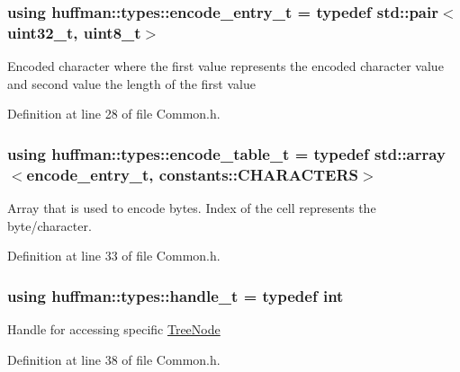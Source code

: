 \subsubsection[{\texorpdfstring{encode\+\_\+entry\+\_\+t}{encode_entry_t}}]{\setlength{\rightskip}{0pt plus 5cm}using {\bf huffman\+::types\+::encode\+\_\+entry\+\_\+t} = typedef std\+::pair$<$uint32\+\_\+t, uint8\+\_\+t$>$}\hypertarget{namespacehuffman_1_1types_a562530b9038f6a3cb2923f1c116a450c}{}\label{namespacehuffman_1_1types_a562530b9038f6a3cb2923f1c116a450c}
Encoded character where the first value represents the encoded character value and second value the length of the first value 

Definition at line 28 of file Common.\+h.

\subsubsection[{\texorpdfstring{encode\+\_\+table\+\_\+t}{encode_table_t}}]{\setlength{\rightskip}{0pt plus 5cm}using {\bf huffman\+::types\+::encode\+\_\+table\+\_\+t} = typedef std\+::array$<${\bf encode\+\_\+entry\+\_\+t}, {\bf constants\+::\+C\+H\+A\+R\+A\+C\+T\+E\+RS}$>$}\hypertarget{namespacehuffman_1_1types_a2d111e21190970dfeb935ef0786973c0}{}\label{namespacehuffman_1_1types_a2d111e21190970dfeb935ef0786973c0}
Array that is used to encode bytes. Index of the cell represents the byte/character. 

Definition at line 33 of file Common.\+h.

\subsubsection[{\texorpdfstring{handle\+\_\+t}{handle_t}}]{\setlength{\rightskip}{0pt plus 5cm}using {\bf huffman\+::types\+::handle\+\_\+t} = typedef int}\hypertarget{namespacehuffman_1_1types_a41dc8ca07e19043152b0a5c8b5fec90b}{}\label{namespacehuffman_1_1types_a41dc8ca07e19043152b0a5c8b5fec90b}
Handle for accessing specific \hyperlink{classhuffman_1_1TreeNode}{Tree\+Node} 

Definition at line 38 of file Common.\+h.

